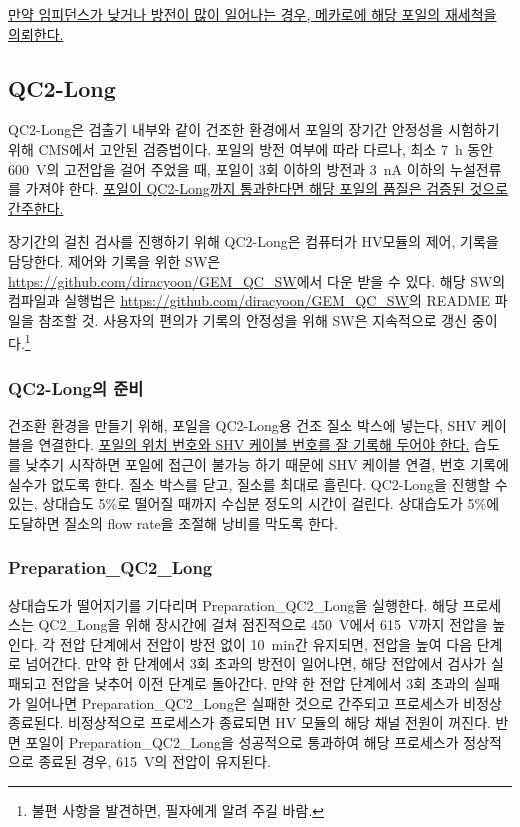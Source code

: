 \uline{만약 임피던스가 낮거나 방전이 많이 일어나는 경우, 메카로에 해당 포일의 재세척을 의뢰한다.}


\subsection{QC2-Long}
QC2-Long은 검출기 내부와 같이 건조한 환경에서 포일의 장기간 안정성을 시험하기 위해 CMS에서 고안된 검증법이다. 포일의 방전 여부에 따라 다르나, 최소 \SI{7}{\hour} 동안 \SI{600}{\volt}의 고전압을 걸어 주었을 때, 포일이 3회 이하의 방전과 \SI{3}{\nano\ampere} 이하의 누설전류를 가져야 한다. \uline{포일이 QC2-Long까지 통과한다면 해당 포일의 품질은 검증된 것으로 간주한다.}

장기간의 걸친 검사를 진행하기 위해 QC2-Long은 컴퓨터가 HV모듈의 제어, 기록을 담당한다. 제어와 기록을 위한 SW은 \url{https://github.com/diracyoon/GEM_QC_SW}에서 다운 받을 수 있다. 해당 SW의 컴파일과 실행법은 \url{https://github.com/diracyoon/GEM_QC_SW}의 README 파일을 참조할 것. 사용자의 편의가 기록의 안정성을 위해 SW은 지속적으로 갱신 중이다.\footnote{불편 사항을 발견하면, 필자에게 알려 주길 바람.}

\subsubsection{QC2-Long의 준비}
건조환 환경을 만들기 위해, 포일을 QC2-Long용 건조 질소 박스에 넣는다, SHV 케이블을 연결한다. \uline{포일의 위치 번호와 SHV 케이블 번호를 잘 기록해 두어야 한다.} 습도를 낮추기 시작하면 포일에 접근이 불가능 하기 때문에 SHV 케이블 연결, 번호 기록에 실수가 없도록 한다. 질소 박스를 닫고, 질소를 최대로 흘린다. QC2-Long을 진행할 수 있는, 상대습도 5\%로 떨어질 때까지 수십분 정도의 시간이 걸린다. 상대습도가 5\%에 도달하면 질소의 flow rate을 조절해 낭비를 막도록 한다.

\subsubsection{Preparation\_QC2\_Long}
상대습도가 떨어지기를 기다리며 Preparation\_QC2\_Long을 실행한다. 해당 프로세스는 QC2\_Long을 위해 장시간에 걸쳐 점진적으로 \SI{450}{\volt}에서  \SI{615}{\volt}까지 전압을 높인다. 각 전압 단계에서 전압이 방전 없이  \SI{10}{\minute}간 유지되면, 전압을 높여 다음 단계로 넘어간다. 만약 한 단계에서 3회 초과의 방전이 일어나면, 해당 전압에서 검사가 실패되고 전압을 낮추어 이전 단계로 돌아간다. 만약 한 전압 단계에서 3회 초과의 실패가 일어나면 Preparation\_QC2\_Long은 실패한 것으로 간주되고 프로세스가 비정상 종료된다. 비정상적으로 프로세스가 종료되면 HV 모듈의 해당 채널 전원이 꺼진다. 반면 포일이 Preparation\_QC2\_Long을 성공적으로 통과하여 해당 프로세스가 정상적으로 종료된 경우, \SI{615}{\volt}의 전압이 유지된다.

